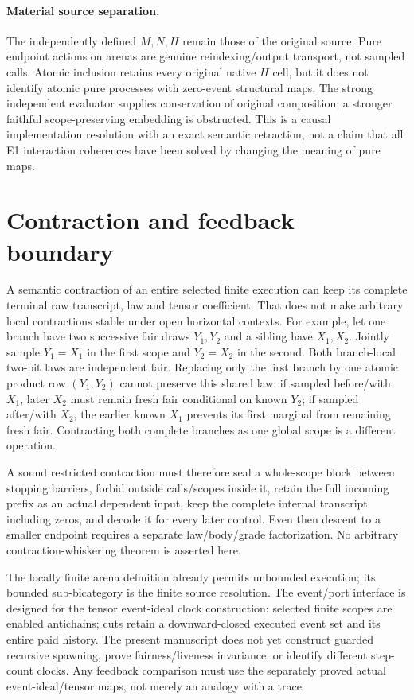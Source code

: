 \documentclass[11pt]{article}
\begin{document}
\paragraph{Material source separation.} The independently defined $M,N,H$ remain those of the original source. Pure endpoint actions on arenas are genuine reindexing/output transport, not sampled calls. Atomic inclusion retains every original native $H$ cell, but it does not identify atomic pure processes with zero-event structural maps. The strong independent evaluator supplies conservation of original composition; a stronger faithful scope-preserving embedding is obstructed. This is a causal implementation resolution with an exact semantic retraction, not a claim that all E1 interaction coherences have been solved by changing the meaning of pure maps.

\section{Contraction and feedback boundary}
A semantic contraction of an entire selected finite execution can keep its complete terminal raw transcript, law and tensor coefficient. That does not make arbitrary local contractions stable under open horizontal contexts. For example, let one branch have two successive fair draws $Y_1,Y_2$ and a sibling have $X_1,X_2$. Jointly sample $Y_1=X_1$ in the first scope and $Y_2=X_2$ in the second. Both branch-local two-bit laws are independent fair. Replacing only the first branch by one atomic product row $(Y_1,Y_2)$ cannot preserve this shared law: if sampled before/with $X_1$, later $X_2$ must remain fresh fair conditional on known $Y_2$; if sampled after/with $X_2$, the earlier known $X_1$ prevents its first marginal from remaining fresh fair. Contracting both complete branches as one global scope is a different operation.

A sound restricted contraction must therefore seal a whole-scope block between stopping barriers, forbid outside calls/scopes inside it, retain the full incoming prefix as an actual dependent input, keep the complete internal transcript including zeros, and decode it for every later control. Even then descent to a smaller endpoint requires a separate law/body/grade factorization. No arbitrary contraction-whiskering theorem is asserted here.

The locally finite arena definition already permits unbounded execution; its bounded sub-bicategory is the finite source resolution. The event/port interface is designed for the tensor event-ideal clock construction: selected finite scopes are enabled antichains; cuts retain a downward-closed executed event set and its entire paid history. The present manuscript does not yet construct guarded recursive spawning, prove fairness/liveness invariance, or identify different step-count clocks. Any feedback comparison must use the separately proved actual event-ideal/tensor maps, not merely an analogy with a trace.
\end{document}
